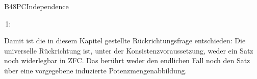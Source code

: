 {B48PCIndependence}{
}
\begin{tabproof}
 {}
 {}
 \proofstep{}{\begin{gathered}
   \BXLVIIICon(\BXLVIIIZFC)\longrightarrow\\
   ((\BXLVIIIZFC\nvdash\BXLVIIIPC)\land
    (\BXLVIIIZFC\nvdash\neg\BXLVIIIPC))
   \end{gathered}}
 {\,1\!:}
\end{tabproof}

\noindent
Damit ist die in diesem Kapitel gestellte Rückrichtungsfrage
entschieden: Die universelle Rückrichtung ist, unter der
Konsistenzvoraussetzung, weder ein Satz noch widerlegbar in ZFC.
Das berührt weder den endlichen Fall noch den Satz über eine
vorgegebene induzierte Potenzmengenabbildung.

